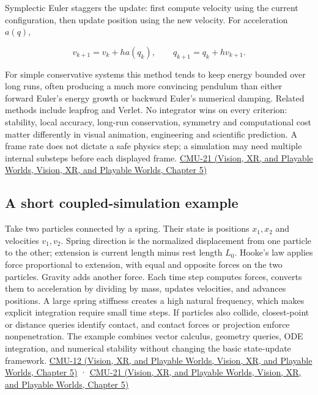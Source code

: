 Symplectic Euler staggers the update: first compute velocity using the current configuration, then update position using the new velocity. For acceleration \(a(q)\),

\[
v_{k+1}=v_k+h a(q_k),\qquad q_{k+1}=q_k+h v_{k+1}.
\]

For simple conservative systems this method tends to keep energy bounded over long runs, often producing a much more convincing pendulum than either forward Euler's energy growth or backward Euler's numerical damping. Related methods include leapfrog and Verlet. No integrator wins on every criterion: stability, local accuracy, long-run conservation, symmetry and computational cost matter differently in visual animation, engineering and scientific prediction. A frame rate does not dictate a safe physics step; a simulation may need multiple internal substeps before each displayed frame. \href{../07-Vision-XR-and-Playable-Worlds/main.pdf\#nameddest=04-visual-computing-ii-ch036-cmu-21---dynamics-and-time-integration}{CMU-21 (Vision, XR, and Playable Worlds, Vision, XR, and Playable Worlds, Chapter 5)}

\subsection{A short coupled-simulation example}\label{04-visual-computing-ii-ch029-a-short-coupled-simulation-example}

Take two particles connected by a spring. Their state is positions \(x_1,x_2\) and velocities \(v_1,v_2\). Spring direction is the normalized displacement from one particle to the other; extension is current length minus rest length \(L_0\). Hooke's law applies force proportional to extension, with equal and opposite forces on the two particles. Gravity adds another force. Each time step computes forces, converts them to acceleration by dividing by mass, updates velocities, and advances positions. A large spring stiffness creates a high natural frequency, which makes explicit integration require small time steps. If particles also collide, closest-point or distance queries identify contact, and contact forces or projection enforce nonpenetration. The example combines vector calculus, geometry queries, ODE integration, and numerical stability without changing the basic state-update framework. \href{../07-Vision-XR-and-Playable-Worlds/main.pdf\#nameddest=04-visual-computing-ii-ch036-cmu-12---geometric-queries}{CMU-12 (Vision, XR, and Playable Worlds, Vision, XR, and Playable Worlds, Chapter 5)} · \href{../07-Vision-XR-and-Playable-Worlds/main.pdf\#nameddest=04-visual-computing-ii-ch036-cmu-21---dynamics-and-time-integration}{CMU-21 (Vision, XR, and Playable Worlds, Vision, XR, and Playable Worlds, Chapter 5)}

